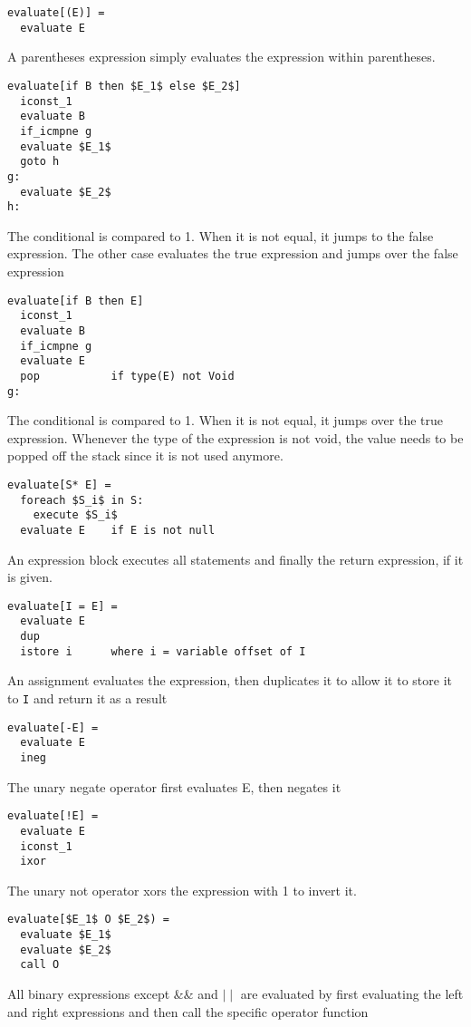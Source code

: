 \begin{lstlisting}
evaluate[(E)] =
  evaluate E
\end{lstlisting}
A parentheses expression simply evaluates the expression within parentheses.
  
\begin{lstlisting}
evaluate[if B then $E_1$ else $E_2$]
  iconst_1
  evaluate B
  if_icmpne	g
  evaluate $E_1$
  goto h
g:
  evaluate $E_2$
h:  
\end{lstlisting}

The conditional is compared to 1. When it is not equal, it jumps to the false expression. The other case evaluates the true expression and jumps over the false expression

\begin{lstlisting}
evaluate[if B then E]
  iconst_1
  evaluate B
  if_icmpne g
  evaluate E
  pop			if type(E) not Void
g:  
\end{lstlisting}

The conditional is compared to 1. When it is not equal, it jumps over the true expression. Whenever the type of the expression is not void, the value needs to be popped off the stack since it is not used anymore.

\begin{lstlisting}
evaluate[S* E] =
  foreach $S_i$ in S:
    execute $S_i$
  evaluate E    if E is not null
\end{lstlisting}
An expression block executes all statements and finally the return expression, if it is given.
 
\begin{lstlisting} 
evaluate[I = E] = 
  evaluate E
  dup
  istore i		where i = variable offset of I
\end{lstlisting}
An assignment evaluates the expression, then duplicates it to allow it to store it to \texttt{I} and return it as a result
  
\begin{lstlisting}  
evaluate[-E] =
  evaluate E
  ineg  
\end{lstlisting}
The unary negate operator first evaluates E, then negates it

\begin{lstlisting}  
evaluate[!E] =
  evaluate E
  iconst_1
  ixor
\end{lstlisting}
The unary not operator xors the expression with 1 to invert it.
  
\begin{lstlisting}  
evaluate[$E_1$ O $E_2$) =
  evaluate $E_1$
  evaluate $E_2$
  call O   
\end{lstlisting}
All binary expressions except \&\& and $\mid\mid$ are evaluated by first evaluating the left and right expressions and then call the specific operator function

